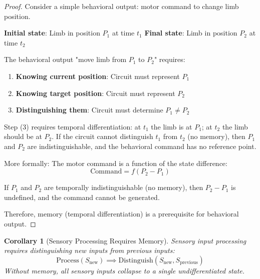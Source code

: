 \documentclass[aps,prd,twocolumn,superscriptaddress,floatfix,nofootinbib]{revtex4-2}
\newtheorem{corollary}[theorem]{Corollary}
\theoremstyle{remark}
\begin{document}
\begin{proof}
Consider a simple behavioral output: motor command to change limb position.

\textbf{Initial state}: Limb in position $P_1$ at time $t_1$
\textbf{Final state}: Limb in position $P_2$ at time $t_2$

The behavioral output "move limb from $P_1$ to $P_2$" requires:
\begin{enumerate}
\item \textbf{Knowing current position}: Circuit must represent $P_1$
\item \textbf{Knowing target position}: Circuit must represent $P_2$
\item \textbf{Distinguishing them}: Circuit must determine $P_1 \neq P_2$
\end{enumerate}

Step (3) requires temporal differentiation: at $t_1$ the limb is at $P_1$; at $t_2$ the limb should be at $P_2$. If the circuit cannot distinguish $t_1$ from $t_2$ (no memory), then $P_1$ and $P_2$ are indistinguishable, and the behavioral command has no reference point.

More formally: The motor command is a function of the state difference:
$$
\text{Command} = f(P_2 - P_1)
$$

If $P_1$ and $P_2$ are temporally indistinguishable (no memory), then $P_2 - P_1$ is undefined, and the command cannot be generated.

Therefore, memory (temporal differentiation) is a prerequisite for behavioral output.
\end{proof}

\begin{corollary}[Sensory Processing Requires Memory]
\label{cor:sensory_memory}
Sensory input processing requires distinguishing new inputs from previous inputs:
\begin{equation}
\text{Process}(S_{\text{new}}) \implies \text{Distinguish}(S_{\text{new}}, S_{\text{previous}})
\end{equation}
Without memory, all sensory inputs collapse to a single undifferentiated state.
\end{corollary}
\end{document}
